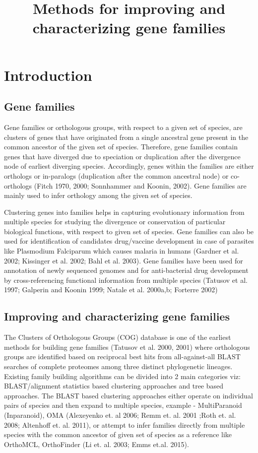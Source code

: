 \documentclass{article}
\begin{document}
	\title{Methods for improving and characterizing gene families}
	\maketitle
	\section{Introduction}
		\subsection{Gene families}
		Gene families or orthologous groups, with respect to a given set of species, are clusters of genes that have originated from a single ancestral gene present in the common ancestor of the given set of species. Therefore, gene families contain genes that have diverged due to speciation or duplication after the divergence node of earliest diverging species. Accordingly, genes within the families are either orthologs or in-paralogs (duplication after the common ancestral node) or co-orthologs (Fitch 1970, 2000; Sonnhammer and Koonin, 2002). Gene families are mainly used to infer orthology among the given set of species.
		
		Clustering genes into families helps in capturing evolutionary information from multiple species for studying the divergence or conservation of particular biological functions, with respect to given set of species. Gene families can also be used for identification of candidates drug/vaccine development in case of parasites like Plasmodium Falciparum which causes malaria in humans (Gardner et al. 2002; Kissinger et al. 2002; Bahl et al. 2003). Gene families have been used for annotation of newly sequenced genomes and for anti-bacterial drug development by cross-referencing functional information from multiple species (Tatusov et al. 1997; Galperin and Koonin 1999; Natale et al. 2000a,b; Forterre 2002)
		
		\subsection{Improving and characterizing gene families}
		The Clusters of Orthologous Groups (COG) database is one of the earliest methods for building gene families (Tatusov et al. 2000, 2001) where orthologous groups are identified based on reciprocal best hits from all-against-all BLAST searches of complete proteomes among three distinct phylogenetic lineages.  
		Existing family building algorithms can be divided into 2 main categories viz: BLAST/alignment statistics based clustering approaches and tree based approaches.
		The BLAST based clustering approaches either operate on individual pairs of species and then expand to multiple species, example - MultiParanoid (Inparanoid), OMA (Alexeyenko et. al 2006; Remm et. al. 2001 ;Roth et. al. 2008; Altenhoff et. al. 2011), or attempt to infer families directly from multiple species with the common ancestor of given set of species as a reference like  OrthoMCL, OrthoFinder (Li et. al. 2003; Emms et.al. 2015).
		  
\end{document}
